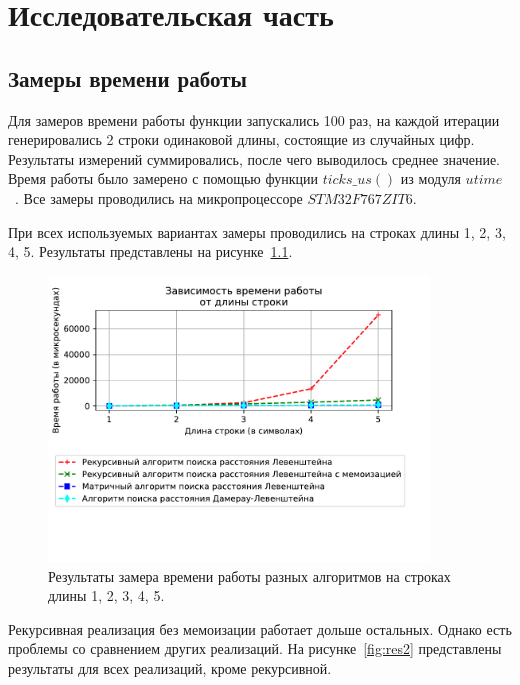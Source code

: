 \chapter{Исследовательская часть}

\section{Замеры времени работы}

Для замеров времени работы функции запускались 100 раз, на каждой итерации генерировались 2 строки одинаковой длины, состоящие из случайных цифр. Результаты измерений суммировались, после чего выводилось среднее значение. Время работы было замерено с помощью функции $ticks\_us()$ из модуля $utime$~\cite{utime}. Все замеры проводились на микропроцессоре $STM32F767ZIT6$.

При всех используемых вариантах замеры проводились на строках длины 1, 2, 3, 4, 5. Результаты представлены на рисунке~\ref{fig:res1}.

\begin{figure}[h!]
	\centering
	\includegraphics[width=0.9\textwidth]{tex_parts/research1.pdf}
	\caption{\label{fig:res1} Результаты замера времени работы разных алгоритмов на строках длины 1, 2, 3, 4, 5.}
\end{figure}

Рекурсивная реализация без мемоизации работает дольше остальных. Однако есть проблемы со сравнением других реализаций. На рисунке~\ref{fig:res2} представлены результаты для всех реализаций, кроме рекурсивной.

